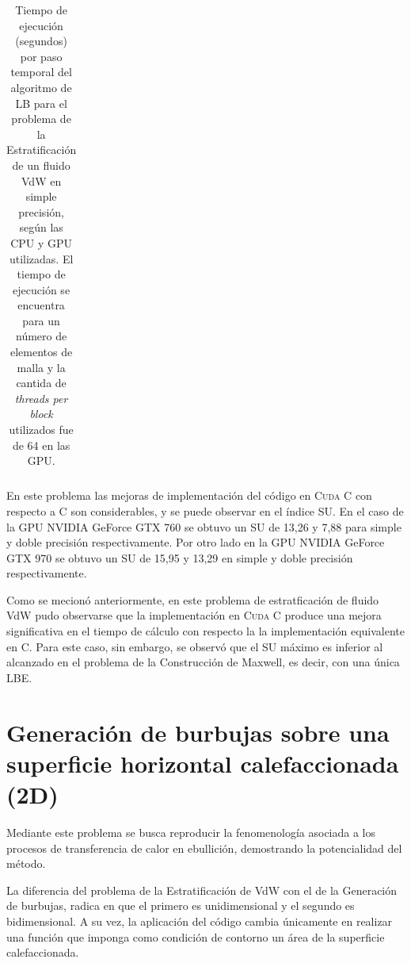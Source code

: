 \begin{table}[H]
{\begin{tabular}{|c|c|c|c|c|}
			
			
	\end{tabular}}
\caption{Tiempo de ejecución (segundos) por paso temporal del algoritmo de LB  para el problema de la Estratificación de un fluido VdW en simple precisión, según las CPU y GPU utilizadas. El tiempo de ejecución se encuentra para un número de elementos de malla y la cantida de \textit{threads per block} utilizados fue de 64 en las GPU.}
\label{tab:VDW_tiempos}
\end{table}

En este problema las mejoras de implementación del código en \textsc{Cuda C} con respecto a \textsc{C} son considerables, y se puede observar en el índice SU. En el caso de la GPU NVIDIA GeForce GTX 760 se obtuvo un SU de 13,26 y 7,88 para simple y doble precisión respectivamente. Por otro lado en la GPU NVIDIA GeForce GTX 970 se obtuvo un SU de 15,95 y 13,29 en simple y doble precisión respectivamente.

Como se mecionó anteriormente, en este problema de estratficación de fluido VdW pudo observarse que la implementación en \textsc{Cuda C} produce una mejora significativa en el tiempo de cálculo con respecto la la implementación equivalente en \textsc{C}. Para este caso, sin embargo, se observó que el SU máximo es inferior al alcanzado en el problema de la Construcción de Maxwell, es decir, con una única LBE.

\newpage
\newpage
\section{Generación de burbujas sobre una superficie horizontal calefaccionada (2D)}

Mediante este problema se busca reproducir la fenomenología asociada a los procesos de transferencia de calor en ebullición, demostrando la potencialidad del método. 

La diferencia del problema de la Estratificación de VdW con el de la Generación de burbujas, radica en que el primero es unidimensional y el segundo es bidimensional. A su vez, la aplicación del código cambia únicamente en realizar una función que imponga como condición de contorno un área de la superficie calefaccionada.

